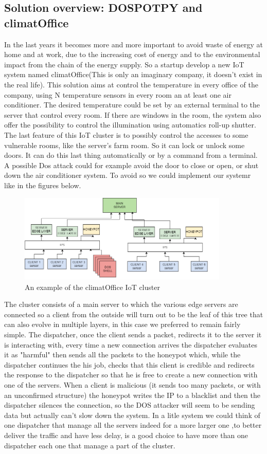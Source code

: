 \subsection{Solution overview: DOSPOTPY and climatOffice}
In the last years it becomes more and more important to avoid waste of energy at home and at work, due to the increasing cost of energy and to the environmental impact from the chain of the energy supply. So a startup develop a new IoT system named climatOffice(This is only an imaginary company, it doesn't exist in the real life). This solution aims at control the temperature in every office of the company, using N temperature sensors in every room an at least one air conditioner. The desired temperature could be set by an external terminal to the server that control every room. If there are windows in the room, the system also offer the possibility to control the illumination using automatics roll-up shutter. The last feature of this IoT cluster is to possibly control the accesses to some vulnerable rooms, like the server's farm room. So it can lock or unlock some doors. It can do this last thing automatically or by a command from a terminal. A possible Dos attack could for example avoid the door to close or open, or shut down the air conditioner system. To avoid so we could implement our systemr like in the figures below.
\begin{figure}[h!]
  \centering
  \includegraphics[width = 10cm]{images/IOTlever2IPS.png}
  \caption{An example of the climatOffice IoT cluster}
  \label{fig:TCPDos}
\end{figure}
\FloatBarrier
\noindent
The cluster consists of a main server to which the various edge servers are connected so a client  from the outside will turn out to be the leaf of this tree that can also evolve in multiple layers, in this case we preferred to remain fairly simple. The dispatcher, once the client sends a packet, redirects it to the server it is interacting with, every time a new connection arrives the dispatcher evaluates it as "harmful" then sends all the packets to the honeypot which, while the dispatcher continues the his job, checks that this client is credible and redirects the response to the dispatcher so that he is free to create a new connection with one of the servers. When a client is malicious (it sends too many packets, or with an unconfirmed structure) the honeypot writes the IP to a blacklist and then the dispatcher silences the connection, so the DOS attacker will seem to be sending data but actually can't slow down the system. In a litle system we could think of one dispatcher that manage all the servers indeed for a more larger one ,to better deliver the traffic and have less delay, is a good choice to have more than one dispatcher each one that manage a part of the cluster.\\
